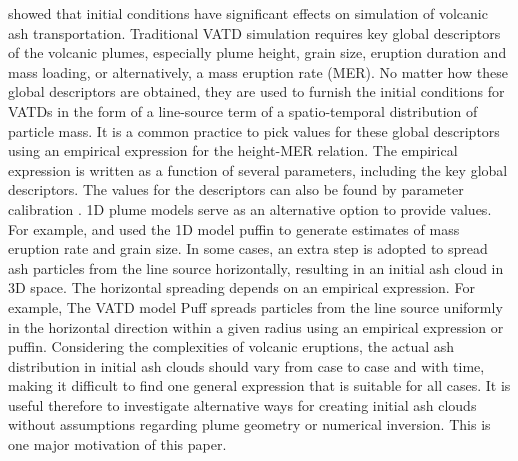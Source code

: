 \documentclass[draft,linenumbers]{agujournal2019}
\begin{document}
\citet{fero2009simulating, stohl2011determination} showed that initial conditions have significant effects on simulation of volcanic ash transportation.  Traditional VATD simulation requires key global descriptors of the volcanic plumes, especially plume height, grain size, eruption duration and mass loading, or alternatively, a mass eruption rate (MER). No matter how these global descriptors are obtained, they are used to furnish the initial conditions for VATDs in the form of a line-source term of a spatio-temporal distribution of particle mass. It is a common practice to pick values for these global descriptors using an empirical expression for the height-MER relation. The empirical expression is written as a function of several parameters, including the key global descriptors.  The values for the descriptors can also be found by parameter calibration \citep[e.g.][]{fero2008simulation,fero2009simulating, stohl2011determination, zidikheri2017estimation}. 1D plume models serve as an alternative option to provide values. For example, \citet{bursik2012estimation} and \citet{stefanescu2014temporal} used the 1D model puffin \citep{bursik2001effect} to generate estimates of mass eruption rate and grain size.  In some cases, an extra step is adopted to spread ash particles from the line source horizontally, resulting in an initial ash cloud in 3D space.  The horizontal spreading depends on an empirical expression. For example, The VATD model Puff spreads particles from the line source uniformly in the horizontal direction within a given radius using an empirical expression or puffin.  Considering the complexities of volcanic eruptions, the actual ash distribution in initial ash clouds should vary from case to case and with time, making it difficult to find one general expression that is suitable for all cases. It is useful therefore to investigate alternative ways for creating initial ash clouds without assumptions regarding plume geometry or numerical inversion. This is one major motivation of this paper.
\end{document}
